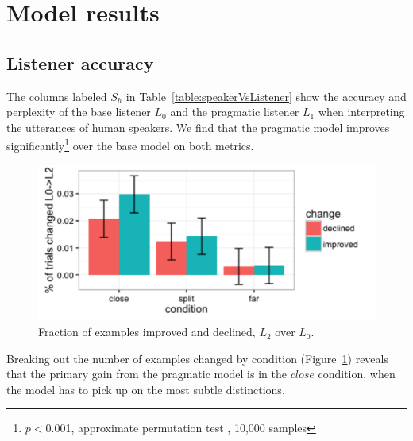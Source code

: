 \documentclass[11pt,letterpaper]{article}
\newcommand{\Listener}{L}
\newcommand{\Speaker}{S}
\renewcommand{\|}{\mid}
\newcommand{\figref}[1]{Figure~\ref{#1}}
\newcommand{\tabref}[1]{Table~\ref{#1}}
\begin{document}
\section{Model results}

\subsection{Listener accuracy}

The columns labeled $\Speaker_h$ in \tabref{table:speakerVsListener} show the accuracy
and perplexity of the base listener $\Listener_0$ and the pragmatic listener
$\Listener_1$ when interpreting the utterances of human speakers. We find that the
pragmatic model improves significantly\footnote{$p <{}$0.001, approximate
permutation test \cite{Pado2006}, 10,000 samples} over the base model on both metrics.

\begin{figure}
\centering
\includegraphics[scale = .45]{figures/changedByCondition.pdf}
\caption{Fraction of examples improved and declined, $\Listener_2$ over $\Listener_0$.}
\label{fig:changedByCondition}
\end{figure}

Breaking out the number of examples changed by condition
(\figref{fig:changedByCondition}) reveals that
the primary gain from the pragmatic model is in the $close$ condition, when the
model has to pick up on the most subtle distinctions.
\end{document}
